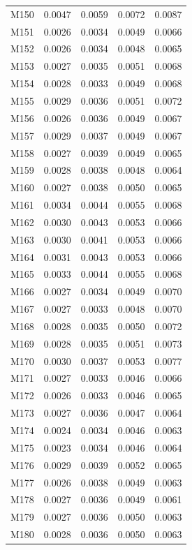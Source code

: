 \begin{longtable}{lrrrr}
M150 & 0.0047 & 0.0059 & 0.0072 & 0.0087 \\
M151 & 0.0026 & 0.0034 & 0.0049 & 0.0066 \\
M152 & 0.0026 & 0.0034 & 0.0048 & 0.0065 \\
M153 & 0.0027 & 0.0035 & 0.0051 & 0.0068 \\
M154 & 0.0028 & 0.0033 & 0.0049 & 0.0068 \\
M155 & 0.0029 & 0.0036 & 0.0051 & 0.0072 \\
M156 & 0.0026 & 0.0036 & 0.0049 & 0.0067 \\
M157 & 0.0029 & 0.0037 & 0.0049 & 0.0067 \\
M158 & 0.0027 & 0.0039 & 0.0049 & 0.0065 \\
M159 & 0.0028 & 0.0038 & 0.0048 & 0.0064 \\
M160 & 0.0027 & 0.0038 & 0.0050 & 0.0065 \\
M161 & 0.0034 & 0.0044 & 0.0055 & 0.0068 \\
M162 & 0.0030 & 0.0043 & 0.0053 & 0.0066 \\
M163 & 0.0030 & 0.0041 & 0.0053 & 0.0066 \\
M164 & 0.0031 & 0.0043 & 0.0053 & 0.0066 \\
M165 & 0.0033 & 0.0044 & 0.0055 & 0.0068 \\
M166 & 0.0027 & 0.0034 & 0.0049 & 0.0070 \\
M167 & 0.0027 & 0.0033 & 0.0048 & 0.0070 \\
M168 & 0.0028 & 0.0035 & 0.0050 & 0.0072 \\
M169 & 0.0028 & 0.0035 & 0.0051 & 0.0073 \\
M170 & 0.0030 & 0.0037 & 0.0053 & 0.0077 \\
M171 & 0.0027 & 0.0033 & 0.0046 & 0.0066 \\
M172 & 0.0026 & 0.0033 & 0.0046 & 0.0065 \\
M173 & 0.0027 & 0.0036 & 0.0047 & 0.0064 \\
M174 & 0.0024 & 0.0034 & 0.0046 & 0.0063 \\
M175 & 0.0023 & 0.0034 & 0.0046 & 0.0064 \\
M176 & 0.0029 & 0.0039 & 0.0052 & 0.0065 \\
M177 & 0.0026 & 0.0038 & 0.0049 & 0.0063 \\
M178 & 0.0027 & 0.0036 & 0.0049 & 0.0061 \\
M179 & 0.0027 & 0.0036 & 0.0050 & 0.0063 \\
M180 & 0.0028 & 0.0036 & 0.0050 & 0.0063 \\

\end{longtable}
